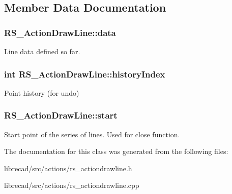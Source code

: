 \subsection{Member Data Documentation}
\hypertarget{classRS__ActionDrawLine_afb8e840ac7a66f7f0126a41173fe157c}{
\subsubsection[{data}]{ R\-S\-\_\-\-Action\-Draw\-Line\-::data\hspace{0.3cm}{\ttfamily [protected]}}}\label{classRS__ActionDrawLine_afb8e840ac7a66f7f0126a41173fe157c}
Line data defined so far. \hypertarget{classRS__ActionDrawLine_ac576f41472eeaee9d60a0b71aa301bbf}{
\subsubsection[{history\-Index}]{\setlength{\rightskip}{0pt plus 5cm}int R\-S\-\_\-\-Action\-Draw\-Line\-::history\-Index\hspace{0.3cm}{\ttfamily [protected]}}}\label{classRS__ActionDrawLine_ac576f41472eeaee9d60a0b71aa301bbf}
Point history (for undo) \hypertarget{classRS__ActionDrawLine_a436f4df5955d62ba44f3702c371928d4}{
\subsubsection[{start}]{ R\-S\-\_\-\-Action\-Draw\-Line\-::start\hspace{0.3cm}{\ttfamily [protected]}}}\label{classRS__ActionDrawLine_a436f4df5955d62ba44f3702c371928d4}
Start point of the series of lines. Used for close function. 

The documentation for this class was generated from the following files\-:\begin{DoxyCompactItemize}
\item 
librecad/src/actions/rs\-\_\-actiondrawline.\-h\item 
librecad/src/actions/rs\-\_\-actiondrawline.\-cpp\end{DoxyCompactItemize}
